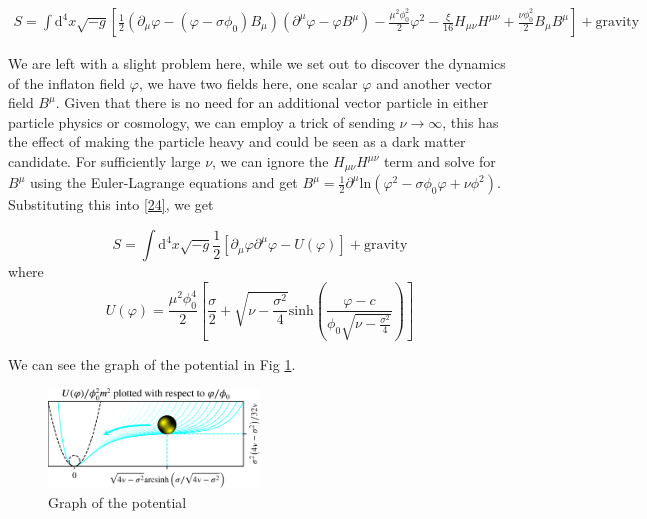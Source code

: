 \documentclass[aps,prd,reprint,preprintnumbers,showpacs,floatfix,nofootinbib,superscript address]{revtex4-2}
\begin{document}
\begin{widetext}
\begin{subequations}
\begin{align}\label{24}
    S = \int \mathrm{d}^4 x \sqrt{-g} \left[ \frac{1}{2}  (\partial_\mu \varphi - (\varphi - \sigma \phi_0)B_\mu)(\partial^\mu \varphi - \varphi B^\mu)  - 
    \frac{\mu^2\phi_{0}^{2}}{2} \varphi^2 - \frac{\xi}{16} H_{\mu\nu}H^{\mu\nu} + \frac{\nu \phi_{0}^{2}}{2} B_\mu B^\mu \right] + \text{gravity}
\end{align}
\end{subequations}
\end{widetext}

We are left with a slight problem here, while we set out to discover the dynamics of the inflaton field $\varphi$, we have two fields here, one scalar $\varphi$ and another vector field $B^\mu$. Given that there is no need for an additional vector particle in either particle physics or cosmology, we can employ a trick of sending $\nu \rightarrow \infty$, this has the effect of making the particle heavy and could be seen as a dark matter candidate. For sufficiently large $\nu$, we can ignore the $H_{\mu\nu}H^{\mu\nu}$ term and solve for $B^\mu$ using the Euler-Lagrange equations and get $B^\mu = \frac{1}{2} \partial^\mu \text{ln}(\varphi^2 - \sigma \phi_0 \varphi + \nu \phi^2)$. Substituting this into \ref{24}, we get

\begin{equation}
    S = \int \mathrm{d}^4 x \sqrt{-g} \frac{1}{2} \left[ \partial_\mu \varphi \partial^\mu \varphi - U(\varphi)   \right] + \text{gravity}
\end{equation}
where
\begin{equation} \label{26}
    U(\varphi) = \frac{\mu^2 \phi_{0}^{4}}{2} \left[ \frac{\sigma}{2} + \sqrt{\nu - \frac{\sigma^2}{4}} \text{sinh}\left( \frac{\varphi - c}{\phi_0 \sqrt{\nu - \frac{\sigma^2}{4}}} \right)  \right]
\end{equation}

We can see the graph of the potential in Fig \ref{Potential from Paper}.
\begin{figure}[h]
    \centering
    \includegraphics[width=0.5\textwidth]{Potential from Paper.png}
    \caption{Graph of the potential \cite{barker2024poincaregaugetheoryconformal}}
    \label{Potential from Paper}
\end{figure}
\end{document}
